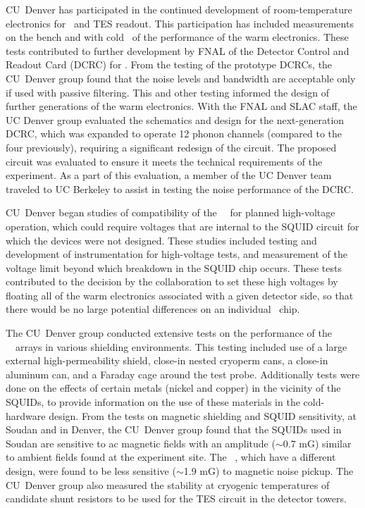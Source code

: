 CU~Denver has participated in the continued development of room-temperature electronics for \SQUID\ and TES readout. This participation has included measurements on the bench and with cold \SQUIDs\ of the performance of the warm electronics. These tests contributed to further development by FNAL of the Detector Control and Readout Card (DCRC) for \scs. From the testing of the prototype DCRCs, the CU~Denver group found that the noise levels and bandwidth are acceptable only if used with passive filtering. This and other testing informed the design of further generations of the warm electronics. With the FNAL and SLAC staff, the UC Denver group evaluated the schematics and design for the next-generation DCRC, which was expanded to operate 12 phonon channels (compared to the four previously), requiring a significant redesign of the circuit. The proposed circuit was evaluated to ensure it meets the technical requirements of the experiment. As a part of this evaluation, a member of the UC Denver team traveled to UC Berkeley to assist in testing the noise performance of the DCRC.


CU~Denver began studies of compatibility of the \scs\ \SQUIDs\ for planned \SuperCDMS high-voltage operation, which could require voltages that are internal to the SQUID circuit for which the devices were not designed. These studies included testing and development of instrumentation for high-voltage tests, and measurement of the voltage limit beyond which breakdown in the SQUID chip occurs. These tests contributed to the decision by the collaboration to set these high voltages by floating all of the warm electronics associated with a given detector side, so that there would be no large potential differences on an individual \SQUID\ chip.


The CU~Denver group conducted extensive tests on the performance of the \scs\ \SQUID\ arrays in various shielding environments. This testing included use of a large external high-permeability shield, close-in nested cryoperm cans, a close-in aluminum can, and a Faraday cage around the test probe. Additionally tests were done on the effects of certain metals (nickel and copper) in the vicinity of the SQUIDs, to provide information on the use of these materials in the cold-hardware design. From the tests on magnetic shielding and SQUID sensitivity, at Soudan and in Denver, the CU~Denver group found that the SQUIDs used in Soudan are sensitive to ac magnetic fields with an amplitude ($\sim$0.7 mG) similar to ambient fields found at the experiment site. The \SNOLAB\ \SQUIDs, which have a different design, were found to be less sensitive ($\sim$1.9 mG) to magnetic noise pickup. The CU~Denver group also measured the stability at cryogenic temperatures of candidate shunt resistors to be used for the TES circuit in the detector towers.


